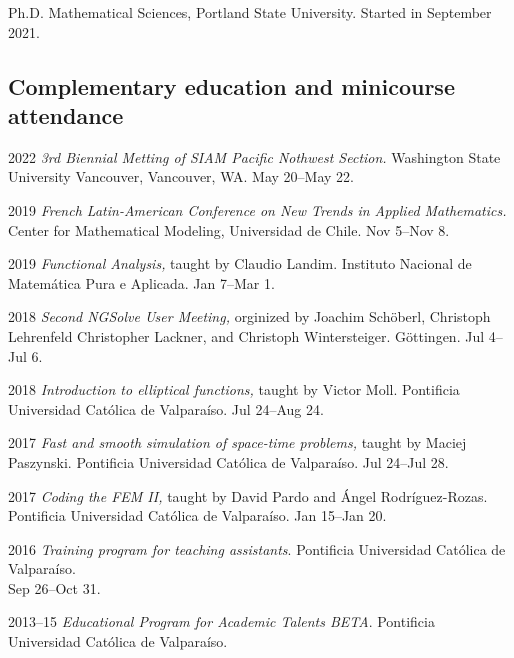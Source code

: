 \documentclass[12pt,letterpaper]{report}
\begin{document}
    \begin{tablist}
        
        \item[Ph.D.] \tab Mathematical Sciences, Portland State University. Started in September 2021.
    \end{tablist}

    \subsection*{Complementary education and minicourse attendance}

    \begin{tablist}

	\item[2022] \tab \emph{3rd Biennial Metting of SIAM Pacific Nothwest Section.} Washington State University Vancouver, Vancouver, WA. May 20--May 22.

        \item[2019] \tab \emph{French Latin-American Conference on New Trends in Applied Mathematics.} Center for Mathematical Modeling, Universidad de Chile. Nov 5--Nov 8.

        \item[2019] \tab \emph{Functional Analysis,} taught by Claudio Landim. Instituto Nacional de Matem\'atica Pura e Aplicada. Jan 7--Mar 1.
        
        \item[2018] \tab \emph{Second NGSolve User Meeting,} orginized by Joachim Schöberl, Christoph Lehrenfeld
        Christopher Lackner, and Christoph Wintersteiger. Göttingen. Jul 4--Jul 6. 

        \item[2018] \tab \emph{Introduction to elliptical functions,} taught by Victor Moll. Pontificia Universidad Cat\'olica de Valpara\'iso. Jul 24--Aug 24.
        
        \item[2017] \tab \emph{Fast and smooth simulation of space-time problems,} taught by Maciej Paszynski. Pontificia Universidad Cat\'olica de Valpara\'iso. Jul 24--Jul 28.
        
        \item[2017] \tab \emph{Coding the FEM II,} taught by David Pardo and \'Angel Rodr\'iguez-Rozas. Pontificia Universidad Cat\'olica de Valpara\'iso. Jan 15--Jan 20. 

        \item[2016]  \tab \emph{Training program for teaching assistants}. Pontificia Universidad Cat\'olica de Valpara\'iso.\\ Sep 26--Oct 31.
        
        \item[2013--15] \tab \emph{Educational Program for Academic Talents BETA}. Pontificia Universidad Cat\'olica de Valpara\'iso.

    \end{tablist}
\end{document}
